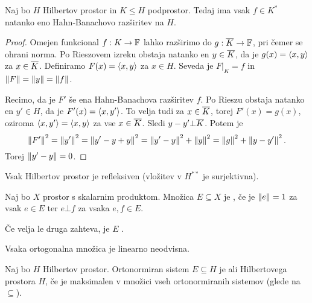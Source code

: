 \begin{izrek}
  Naj bo $H$ Hilbertov prostor in $K \le H$ podprostor.
  Tedaj ima vsak $f \in K^*$ natanko eno Hahn-Banachovo razširitev na $H$.
\end{izrek}

\begin{proof}
  Omejen funkcional $f: K \to \mathbb{F}$ lahko razširimo do $g: \overline{K} \to \mathbb{F}$, pri
  čemer se ohrani norma.
  Po Rieszovem izreku obstaja natanko en $y \in \overline{K}$, da je $g(x) =
  \left< x,y \right>$ za $x \in \overline{K}$.
  Definiramo $F(x) = \left< x,y \right>$ za $x \in H$.
  Seveda je $\left. F \right|_K = f$ in $\left\lVert F\right\rVert = \left\lVert y\right\rVert = \left\lVert f\right\rVert$.

  Recimo, da je $F'$ še ena Hahn-Banachova razširitev $f$.
  Po Rieszu obstaja natanko en $y' \in H$, da je $F'(x) = \left< x,y' \right>$.
  To velja tudi za $x \in \overline{K}$, torej $F'(x) = g(x)$,
  oziroma $\left< x,y' \right> = \left< x,y \right>$ za vse $x \in \overline{K}$.
  Sledi $y-y' \bot \overline{K}$.
  Potem je
  \[
	\left\lVert F'\right\rVert^2 = \left\lVert y'\right\rVert^2 = \left\lVert y' - y + y\right\rVert^2
	= \left\lVert y' - y\right\rVert^2 + \left\lVert y\right\rVert^2 = \left\lVert g\right\rVert^2 + \left\lVert y - y'\right\rVert^2.
  \]
  Torej $\left\lVert y'-y\right\rVert = 0$.
\end{proof}


\begin{posledica}
  Vsak Hilbertov prostor je refleksiven (vložitev v $H^{**}$ je surjektivna).
\end{posledica}


\begin{definicija}
  Naj bo $X$ prostor s skalarnim produktom.
  Množica $E \subseteq X$ je , če je $\left\lVert e\right\rVert = 1$
  za vsak $e \in E$ ter $e \bot f$ za vsaka $e,f \in E$.
\end{definicija}

\begin{opomba}
  Če velja le druga zahteva, je $E$ .
\end{opomba}

\begin{lema}
  Vsaka ortogonalna množica je linearno neodvisna.
\end{lema}

\begin{definicija}
  Naj bo $H$ Hilbertov prostor. Ortonormiran sistem $E \subseteq H$ je
   ali  Hilbertovega prostora $H$, če je maksimalen
  v množici vseh ortonormiranih sistemov (glede na $\subseteq$).
\end{definicija}

